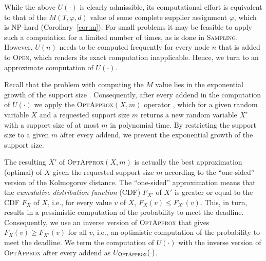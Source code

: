 \documentclass[letterpaper]{article} %
\newcommand{\sampling}{\textsc{Sampling}\xspace}
\newcommand{\open}{\textsc{Open}\xspace}
\newcommand{\optapprox}{\textsc{OptApprox}\xspace}
\begin{document}


While the above $U(\cdot)$ is clearly admissible, its computational effort is equivalent to that of the $M(T,\varphi,d)$ value of some complete supplier assignment $\varphi$, which is NP-hard (Corollary~\ref{cor:m}). For small problems it may be feasible to apply such a computation for a limited number of times, as is done in \sampling. However, $U(n)$ needs to be computed frequently for every node $n$ that is added to \open, which renders its exact computation inapplicable. Hence, we turn to an approximate computation of $U(\cdot)$.

Recall that the problem with computing the $M$ value lies in the exponential growth of the support size \cite{cohen2015estimating}. Consequently, after every addend in the computation of $U(\cdot)$ we apply the \optapprox$(X,m)$ operator \cite{cohen2018optimal}, which for a given random variable $X$ and a requested support size $m$ returns a new random variable $X'$ with a support size of at most $m$ in polynomial time. By restricting the support size to a given $m$ after every addend, we prevent the exponential growth of the support size.

The resulting $X'$ of \optapprox$(X,m)$ is actually the best approximation (optimal) of $X$ given the requested support size $m$ according to the ``one-sided'' version of the Kolmogorov distance. The ``one-sided'' approximation means that the \emph{cumulative distribution function} (CDF) $F_{X'}$ of $X'$ is greater or equal to the CDF $F_{X}$ of $X$, i.e., for every value $v$ of $X$, $F_{X}(v)\leq F_{X'}(v)$. This, in turn, results in a pessimistic computation of the probability to meet the deadline. Consequently, we use an inverse version of \optapprox that gives $F_{X}(v)\geq F_{X'}(v)$ for all $v$, i.e., an optimistic computation of the probability to meet the deadline. We term the computation of $U(\cdot)$ with the inverse version of \optapprox after every addend as $U_{\optapprox}(\cdot)$.
\end{document}

